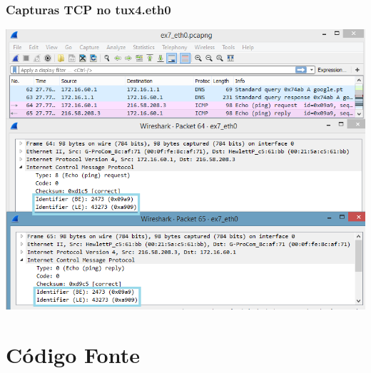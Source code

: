 \documentclass[11pt,a4paper,reqno]{report}
\numberwithin{equation}{section}
\begin{document}
\begin{appendices}
\subsection{Capturas TCP no tux4.eth0}
\label{ex7_ping}
\includegraphics[width=18cm]{ex7_ping.png}

\chapter{Código Fonte}






\pagebreak


\end{appendices}
\end{document}
